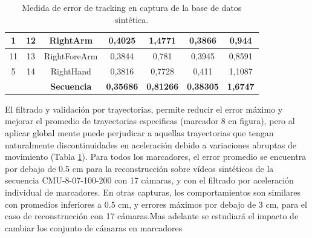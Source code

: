 \begin{table}[ht!]
{\begin{tabular}{|c|c|c|c|c|c|c|}
1        & 12        & RightArm           & 0,4025                                                       & 1,4771                                                       & 0,3866                                                                  & 0,944                                                                   \\ \hline
11       & 13        & RightForeArm       & 0,3844                                                       & 0,781                                                        & 0,3945                                                                  & 0,8591                                                                  \\ \hline
5        & 14        & RightHand          & 0,3816                                                       & 0,7728                                                       & 0,411                                                                   & 1,1087                                                                  \\ \hline
         &           & \textbf{Secuencia} & \textbf{0,35686}                                             & \textbf{0,81266}                                             & \textbf{0,38305}                                                        & \textbf{1,6747}                                                         \\ \hline
\end{tabular}
}
\caption{Medida de error de tracking en captura de la base de datos sintética.}
\label{tablaerrortrack}
\end{table}



El filtrado y validación por trayectorias, permite reducir el error máximo y mejorar el promedio de trayectorias especificas (marcador 8 en figura), pero al aplicar global mente puede perjudicar a aquellas trayectorias que tengan naturalmente discontinuidades en aceleración debido a variaciones abruptas de movimiento (Tabla \ref{tablaerrortrack}). Para todos los marcadores, el error promedio se encuentra por debajo de 0.5 cm para la reconstrucción sobre vídeos sintéticos de la secuencia CMU-8-07-100-200 con 17 cámaras, y con el filtrado por aceleración individual de marcadores. En otras capturas, los comportamientos son similares con promedios inferiores a 0.5 cm, y errores máximos por debajo de 3 cm, para el caso de reconstrucción con 17 cámaras.Mas adelante se estudiará el impacto de cambiar los conjunto de cámaras en marcadores   


